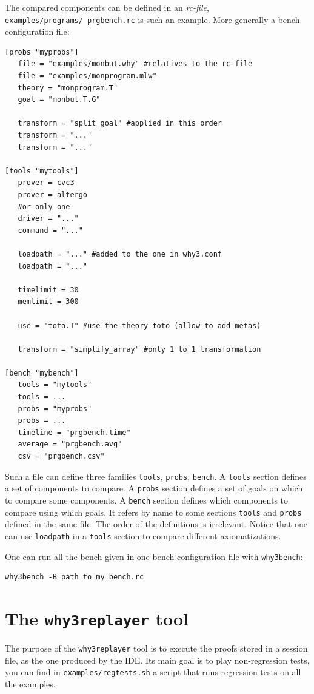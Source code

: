 The compared components can be defined in an \emph{rc-file},
\texttt{examples/programs/\ prgbench.rc} is such an example. More
generally a bench configuration file:
\begin{verbatim}
[probs "myprobs"]
   file = "examples/monbut.why" #relatives to the rc file
   file = "examples/monprogram.mlw"
   theory = "monprogram.T"
   goal = "monbut.T.G"

   transform = "split_goal" #applied in this order
   transform = "..."
   transform = "..."

[tools "mytools"]
   prover = cvc3
   prover = altergo
   #or only one
   driver = "..."
   command = "..."

   loadpath = "..." #added to the one in why3.conf
   loadpath = "..."

   timelimit = 30
   memlimit = 300

   use = "toto.T" #use the theory toto (allow to add metas)

   transform = "simplify_array" #only 1 to 1 transformation

[bench "mybench"]
   tools = "mytools"
   tools = ...
   probs = "myprobs"
   probs = ...
   timeline = "prgbench.time"
   average = "prgbench.avg"
   csv = "prgbench.csv"
\end{verbatim}

Such a file can define three families \texttt{tools}, \texttt{probs},
\texttt{bench}. A \texttt{tools} section defines a set of components to
compare. A \texttt{probs} section defines a set of goals on which to compare some
components. A \texttt{bench} section defines which components to
compare using which goals. It refers by name to some sections
\texttt{tools} and \texttt{probs} defined in the same file. The order
of the definitions is irrelevant. Notice that one can use
\texttt{loadpath} in a \texttt{tools} section to compare different
axiomatizations.

One can run all the bench given in one bench configuration file with
\texttt{why3bench}:
\begin{verbatim}
why3bench -B path_to_my_bench.rc
\end{verbatim}

\section{The \texttt{why3replayer} tool}
\label{sec:why3replayer}

The purpose of the \texttt{why3replayer} tool is to execute the proofs
stored in a \why session file, as the one produced by the IDE. Its
main goal is to play non-regression tests, \eg you can find in
\texttt{examples/regtests.sh} a script that runs regression tests on
all the examples.


